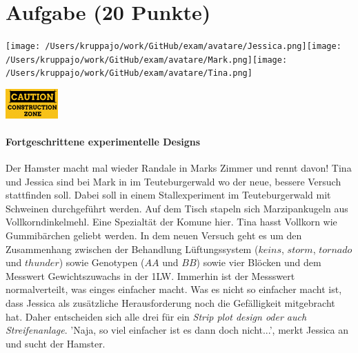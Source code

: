 \documentclass[a4paper, 9pt]{scrartcl}\usepackage[]{graphicx}\usepackage[]{xcolor}
\begin{document}
 
\clearpage

\section{Aufgabe \hfill (20 Punkte)}


 
\begin{minipage}[t]{0.5\textwidth}
\texttt{[image: /Users/kruppajo/work/GitHub/exam/avatare/Jessica.png]}\hspace{-4mm}\texttt{[image: /Users/kruppajo/work/GitHub/exam/avatare/Mark.png]}\hspace{-4mm}\texttt{[image: /Users/kruppajo/work/GitHub/exam/avatare/Tina.png]}
\end{minipage}
\begin{minipage}[t]{0.5\textwidth}
\hfill
\href{https://youtu.be/wJqsNV1hOW8}{\includegraphics[width = 2cm]{img/caution}}
\end{minipage}



\paragraph{Fortgeschrittene experimentelle Designs}

Der Hamster macht mal wieder Randale in Marks Zimmer und rennt davon! Tina und Jessica sind bei Mark in im Teuteburgerwald wo der neue, bessere Versuch stattfinden soll. Dabei soll in einem Stallexperiment im Teuteburgerwald mit Schweinen durchgeführt werden. Auf dem Tisch stapeln sich Marzipankugeln aus Vollkorndinkelmehl. Eine Spezialtät der Komune hier. Tina hasst Vollkorn wie Gummibärchen geliebt werden. In dem neuen Versuch geht es um den Zusammenhang zwischen der Behandlung Lüftungssystem ($keins$, $storm$, $tornado$ und $thunder$) sowie Genotypen ($AA$ und $BB$) sowie vier Blöcken und dem Messwert Gewichtszuwachs in der 1LW. Immerhin ist der Messswert normalverteilt, was einges einfacher macht. Was es nicht so einfacher macht ist, dass Jessica als zusätzliche Herausforderung noch die Gefälligkeit mitgebracht hat. Daher entscheiden sich alle drei für ein \textit{Strip plot design oder auch Streifenanlage}. 'Naja, so viel einfacher ist es dann doch nicht...', merkt Jessica an und sucht der Hamster.\\
\end{document}
